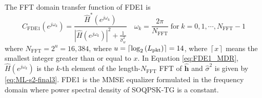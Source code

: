 The FFT domain transfer function of FDE1 is \cite[eq. (11)]{williams2013linear}
\begin{equation}
C_\text{FDE1}(e^{j\omega_k}) = \frac{\hat{H}^\ast(e^{j\omega_k})}  {|\hat{H}(e^{j\omega_k})|^2  +  \frac{1}{\hat{\sigma}^2_w}} \quad
\omega_k = \frac{2\pi}{N_\text{FFT}} \;
\text{for} \;
k=0,1,\cdots,N_\text{FFT}-1
\label{eq:FDE1_MDR}
\end{equation}
where $N_\text{FFT} = 2^u = 16{,}384$, where $u = {\left\lceil \log_2{\left(L_\text{pkt}\right)}  \right\rceil} = 14$,
where $\left\lceil x  \right\rceil$ means the smallest integer greater than or equal to $x$.
In Equation \eqref{eq:FDE1_MDR}, $\hat{H}(e^{j\omega_k})$ is the $k$-th element of the length-$N_\text{FFT}$ FFT of $\mathbf{\hat{h}}$ and $\hat{\sigma}^2$ is given by \eqref{eq:ML-s2-final3}.
FDE1 is the MMSE equalizer formulated in the frequency domain where power spectral density of SOQPSK-TG is a constant.


